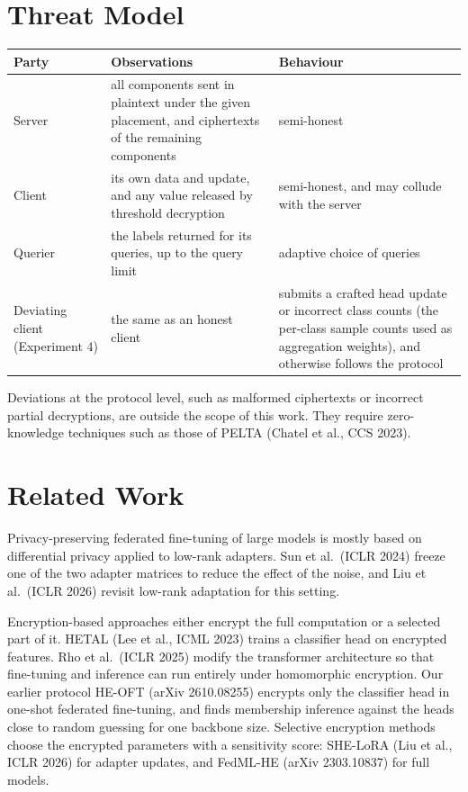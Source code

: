 \documentclass[10pt,a4paper]{article}
\begin{document}
\section{Threat Model}

\begin{center}
\small
\begin{tabular}{@{}>{\raggedright\arraybackslash}p{2.6cm}>{\raggedright\arraybackslash}p{6.4cm}>{\raggedright\arraybackslash}p{6.2cm}@{}}
\toprule
Party & Observations & Behaviour \\
\midrule
Server & all components sent in plaintext under the given placement, and ciphertexts of the remaining components & semi-honest \\
Client & its own data and update, and any value released by threshold decryption & semi-honest, and may collude with the server \\
Querier & the labels returned for its queries, up to the query limit & adaptive choice of queries \\
Deviating client (Experiment 4) & the same as an honest client & submits a crafted head update or incorrect class counts (the per-class sample counts used as aggregation weights), and otherwise follows the protocol \\
\bottomrule
\end{tabular}
\end{center}

Deviations at the protocol level, such as malformed ciphertexts or incorrect partial decryptions, are outside the scope of this work. They require zero-knowledge techniques such as those of PELTA (Chatel et al., CCS 2023).

\section{Related Work}

Privacy-preserving federated fine-tuning of large models is mostly based on differential privacy applied to low-rank adapters. Sun et al.\ (ICLR 2024) freeze one of the two adapter matrices to reduce the effect of the noise, and Liu et al.\ (ICLR 2026) revisit low-rank adaptation for this setting.

Encryption-based approaches either encrypt the full computation or a selected part of it. HETAL (Lee et al., ICML 2023) trains a classifier head on encrypted features. Rho et al.\ (ICLR 2025) modify the transformer architecture so that fine-tuning and inference can run entirely under homomorphic encryption. Our earlier protocol HE-OFT (arXiv 2610.08255) encrypts only the classifier head in one-shot federated fine-tuning, and finds membership inference against the heads close to random guessing for one backbone size. Selective encryption methods choose the encrypted parameters with a sensitivity score: SHE-LoRA (Liu et al., ICLR 2026) for adapter updates, and FedML-HE (arXiv 2303.10837) for full models.
\end{document}
